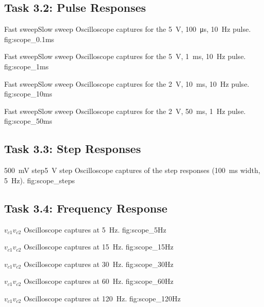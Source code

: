 \documentclass[12pt]{article}
\begin{document}
\subsection*{Task 3.2: Pulse Responses}

  {Fast sweep}{Slow sweep}
  {Oscilloscope captures for the \qty{5}{\volt}, \qty{100}{\micro\second}, \qty{10}{\hertz} pulse.}
  {fig:scope_0.1ms}

  {Fast sweep}{Slow sweep}
  {Oscilloscope captures for the \qty{5}{\volt}, \qty{1}{\milli\second}, \qty{10}{\hertz} pulse.}
  {fig:scope_1ms}

  {Fast sweep}{Slow sweep}
  {Oscilloscope captures for the \qty{2}{\volt}, \qty{10}{\milli\second}, \qty{10}{\hertz} pulse.}
  {fig:scope_10ms}

  {Fast sweep}{Slow sweep}
  {Oscilloscope captures for the \qty{2}{\volt}, \qty{50}{\milli\second}, \qty{1}{\hertz} pulse.}
  {fig:scope_50ms}

\subsection*{Task 3.3: Step Responses}

  {\qty{500}{\milli\volt} step}{\qty{5}{\volt} step}
  {Oscilloscope captures of the step responses (\qty{100}{\milli\second} width, \qty{5}{\hertz}).}
  {fig:scope_steps}

\subsection*{Task 3.4: Frequency Response}

  {$v_{c1}$}{$v_{c2}$}
  {Oscilloscope captures at \qty{5}{\hertz}.}
  {fig:scope_5Hz}

  {$v_{c1}$}{$v_{c2}$}
  {Oscilloscope captures at \qty{15}{\hertz}.}
  {fig:scope_15Hz}

  {$v_{c1}$}{$v_{c2}$}
  {Oscilloscope captures at \qty{30}{\hertz}.}
  {fig:scope_30Hz}

  {$v_{c1}$}{$v_{c2}$}
  {Oscilloscope captures at \qty{60}{\hertz}.}
  {fig:scope_60Hz}

  {$v_{c1}$}{$v_{c2}$}
  {Oscilloscope captures at \qty{120}{\hertz}.}
  {fig:scope_120Hz}
\end{document}
